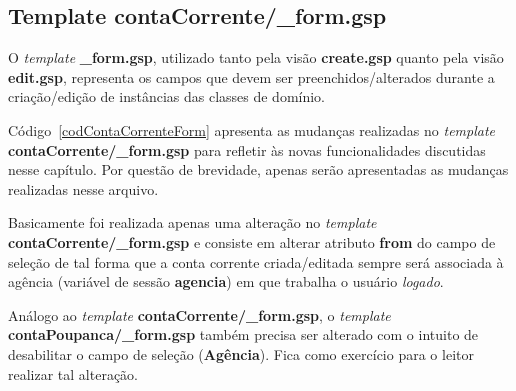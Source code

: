 \subsection{Template contaCorrente/\_form.gsp}

\vspace{0.5cm}

O {\it template}  {\bf \_form.gsp}, utilizado tanto pela  visão {\bf create.gsp}
quanto  pela  visão   {\bf  edit.gsp},  representa  os  campos   que  devem  ser
preenchidos/alterados  durante a  criação/edição  de instâncias  das classes  de
domínio. 

Código~\ref{codContaCorrenteForm}  apresenta  as  mudanças  realizadas  no  {\it
  template}    {\bf   contaCorrente/\_form.gsp}    para   refletir    às   novas
funcionalidades  discutidas nesse  capítulo.  Por questão  de brevidade,  apenas
serão apresentadas as mudanças realizadas nesse arquivo.

Basicamente  foi   realizada  apenas  uma  alteração  no   {\it  template}  {\bf
  contaCorrente/\_form.gsp} e  consiste em alterar atributo {\bf  from} do campo
de  seleção  de  tal forma  que  a  conta  corrente criada/editada  sempre  será
associada à agência (variável de sessão {\bf agencia}) em que trabalha o usuário
{\it logado}.

\vspace{0.5cm}
 
\begin{remark}
Análogo ao {\it template}  {\bf contaCorrente/\_form.gsp}, o {\it template} {\bf
  contaPoupanca/\_form.gsp}  também  precisa  ser  alterado  com  o  intuito  de
desabilitar  o campo  de seleção  ({\bf Agência}).  Fica como  exercício  para o
leitor realizar tal alteração. 
\end{remark}

